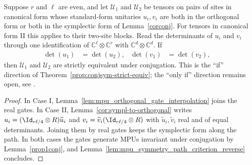\begin{lemma}
    \label{thm:mpu_conjugation_even_rank_if}
    \leanok
    Suppose $r$ and $\ell$ are even, and let $\mathcal U_1$ and $\mathcal U_2$
    be tensors on pairs of sites in canonical form whose standard-form
    unitaries $u_i,v_i$ are both in the orthogonal form or both in the
    symplectic form of Lemma~\ref{corconj}. For tensors in canonical form II
    this applies to their two-site blocks. Read the determinants of $u_i$ and $v_i$ through one
    identification of $\mathbb C^\ell\otimes\mathbb C^r$ with
    $\mathbb C^d\otimes\mathbb C^d$. If
    \begin{align}
        \det(u_1) & =\det(u_2), &
        \det(v_1) & =\det(v_2),
    \end{align}
    then $\mathcal U_1$ and $\mathcal U_2$ are strictly equivalent under
    conjugation. This is the ``if'' direction of
    Theorem~\ref{prop:conjsym-strict-equiv}; the ``only if'' direction remains
    open, see \cite{gap:mpu_symmetry_path_criterion_blocking}.
\end{lemma}

\begin{proof}
    \leanok
    In Case I, Lemma~\ref{lem:mpu_orthogonal_gate_interpolation} joins the real
    gates. In Case II, Lemma~\ref{cor:sympl-to-orthogonal} writes
    $u_i=(\Id_{r\ell/4}\otimes R)\widetilde u_i$ and
    $v_i=\widetilde v_i(\Id_{r\ell/4}\otimes R)$ with $\widetilde u_i,
        \widetilde v_i$ real and of equal determinants. Joining them by real gates
    keeps the symplectic form along the path. In both cases the gates
    generate MPUs invariant under conjugation by Lemma~\ref{prop1conj}, and
    Lemma~\ref{lem:mpu_symmetry_path_criterion_reverse} concludes.
\end{proof}


